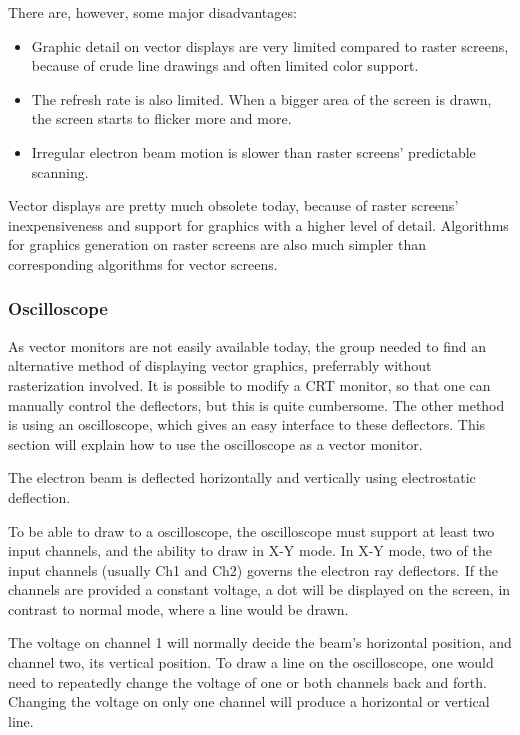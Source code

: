 There are, however, some major disadvantages:
\begin{itemize}
\item Graphic detail on vector displays are very limited compared to raster screens, because of crude line drawings and often limited color support.
\item The refresh rate is also limited. When a bigger area of the screen is drawn, the screen starts to flicker more and more.
\item Irregular electron beam motion is slower than raster screens' predictable scanning.
\end{itemize} 

Vector displays are pretty much obsolete today, because of raster screens' inexpensiveness and support for graphics with a higher level of detail. Algorithms for graphics generation on raster screens are also much simpler than corresponding algorithms for vector screens.

\subsubsection{Oscilloscope}
As vector monitors are not easily available today, the group needed to find an alternative method of displaying vector graphics, preferrably without rasterization involved.
It is possible to modify a CRT monitor, so that one can manually control the deflectors, but this is quite cumbersome.
The other method is using an oscilloscope, which gives an easy interface to these deflectors.
This section will explain how to use the oscilloscope as a vector monitor.

The electron beam is deflected horizontally and vertically using electrostatic deflection. \cite{vector-monitor}

To be able to draw to a oscilloscope, the oscilloscope must support at least two input channels, and the ability to draw in X-Y mode.
In X-Y mode, two of the input channels (usually Ch1 and Ch2) governs the electron ray deflectors.
If the channels are provided a constant voltage, a dot will be displayed on the screen, in contrast to normal mode, where  a line would be drawn.

The voltage on channel 1 will normally decide the beam's horizontal position, and channel two, its vertical position.
To draw a line on the oscilloscope, one would need to repeatedly change the voltage of one or both channels back and forth.
Changing the voltage on only one channel will produce a horizontal or vertical line.

